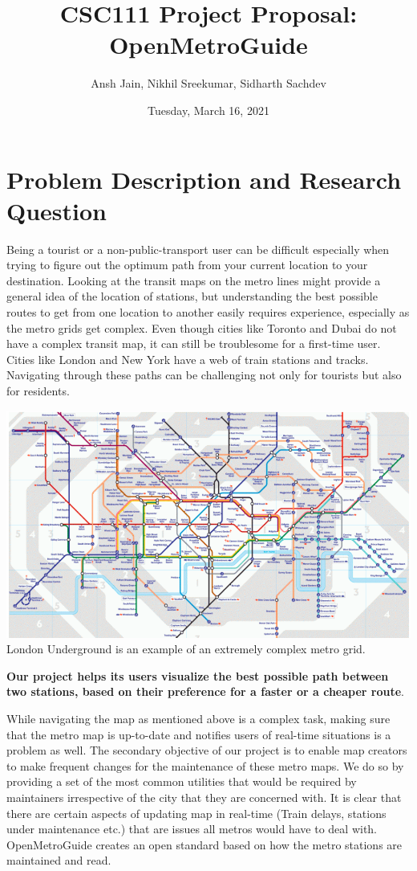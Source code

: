 \documentclass[fontsize=11pt]{article}
\title{CSC111 Project Proposal: OpenMetroGuide}
\author{Ansh Jain, Nikhil Sreekumar, Sidharth Sachdev}
\date{Tuesday, March 16, 2021}
\begin{document}
\maketitle

\section*{Problem Description and Research Question}

Being a tourist or a non-public-transport user can be difficult especially when trying to figure out the optimum path from your current location to your destination. Looking at the transit maps on the metro lines might provide a general idea of the location of stations, but understanding the best possible routes to get from one location to another easily requires experience, especially as the metro grids get complex. Even though cities like Toronto and Dubai do not have a complex transit map, it can still be troublesome for a first-time user. Cities like London and New York have a web of train stations and tracks. Navigating through these paths can be challenging not only for tourists but also for residents.\newline


\begin{center}
	\includegraphics[width = 14cm]{London Transit Map.png}\newline
	London Underground is an example of an extremely complex metro grid.
\end{center}

\textbf{Our project helps its users visualize the best possible path between two stations, based on their preference for a faster or a cheaper route}.\newline 

While navigating the map as mentioned above is a complex task, making sure that the metro map is up-to-date and notifies users of real-time situations is a problem as well. The secondary objective of our project is to enable map creators to make frequent changes for the maintenance of these metro maps. We do so by providing a set of the most common utilities that would be required by maintainers irrespective of the city that they are concerned with. It is clear that there are certain aspects of updating map in real-time (Train delays, stations under maintenance etc.) that are issues all metros would have to deal with. OpenMetroGuide creates an open standard  based on how the metro stations are maintained and read.\newline
\end{document}

